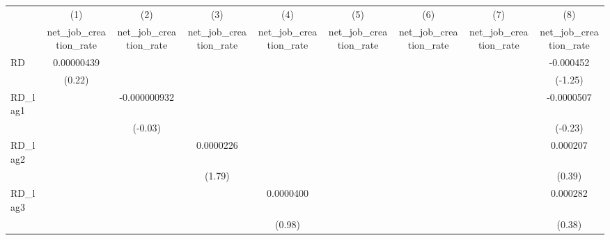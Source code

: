 {
\def\sym#1{\ifmmode^{#1}\else\(^{#1}\)\fi}
\begin{tabular}{l*{8}{c}}
\toprule
            &\multicolumn{1}{c}{(1)}&\multicolumn{1}{c}{(2)}&\multicolumn{1}{c}{(3)}&\multicolumn{1}{c}{(4)}&\multicolumn{1}{c}{(5)}&\multicolumn{1}{c}{(6)}&\multicolumn{1}{c}{(7)}&\multicolumn{1}{c}{(8)}\\
            &\multicolumn{1}{c}{net\_job\_creation\_rate}&\multicolumn{1}{c}{net\_job\_creation\_rate}&\multicolumn{1}{c}{net\_job\_creation\_rate}&\multicolumn{1}{c}{net\_job\_creation\_rate}&\multicolumn{1}{c}{net\_job\_creation\_rate}&\multicolumn{1}{c}{net\_job\_creation\_rate}&\multicolumn{1}{c}{net\_job\_creation\_rate}&\multicolumn{1}{c}{net\_job\_creation\_rate}\\
\midrule
RD          &  0.00000439         &                     &                     &                     &                     &                     &                     &   -0.000452         \\
            &      (0.22)         &                     &                     &                     &                     &                     &                     &     (-1.25)         \\
\addlinespace
RD\_lag1     &                     &-0.000000932         &                     &                     &                     &                     &                     &  -0.0000507         \\
            &                     &     (-0.03)         &                     &                     &                     &                     &                     &     (-0.23)         \\
\addlinespace
RD\_lag2     &                     &                     &   0.0000226         &                     &                     &                     &                     &    0.000207         \\
            &                     &                     &      (1.79)         &                     &                     &                     &                     &      (0.39)         \\
\addlinespace
RD\_lag3     &                     &                     &                     &   0.0000400         &                     &                     &                     &    0.000282         \\
            &                     &                     &                     &      (0.98)         &                     &                     &                     &      (0.38)         \\

\end{tabular}}
